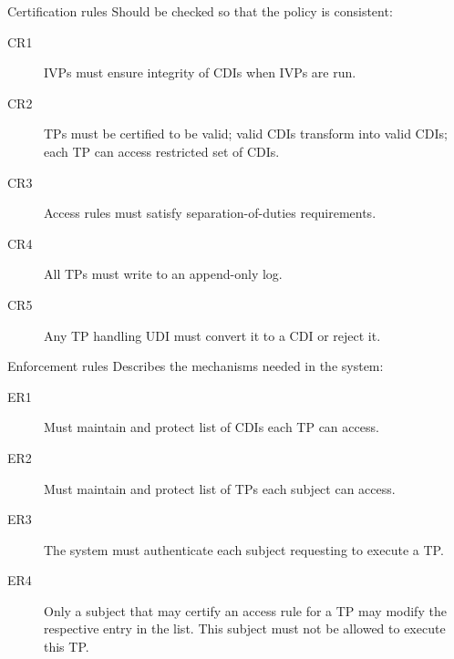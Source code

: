 \begin{frame}
  \begin{block}{Certification rules}
    Should be checked so that the policy is consistent:
    \begin{description}
      \item[CR1] IVPs must ensure integrity of CDIs when IVPs are run.
      \item[CR2] TPs must be certified to be valid; valid CDIs transform into 
        valid CDIs; each TP can access restricted set of CDIs.
      \item[CR3] Access rules must satisfy separation-of-duties requirements.
      \item[CR4] All TPs must write to an append-only log.
      \item[CR5] Any TP handling UDI must convert it to a CDI or reject it.
    \end{description}
  \end{block}
\end{frame}

\begin{frame}
  \begin{block}{Enforcement rules}
    Describes the mechanisms needed in the system:
    \begin{description}
      \item[ER1] Must maintain and protect list of CDIs each TP can access.
      \item[ER2] Must maintain and protect list of TPs each subject can access.
      \item[ER3] The system must authenticate each subject requesting to execute 
        a TP\@.
      \item[ER4] Only a subject that may certify an access rule for a TP may 
        modify the respective entry in the list.
        This subject must not be allowed to execute this TP\@.
    \end{description}
  \end{block}
\end{frame}



\begin{frame}
  \small
  \printbibliography{}
\end{frame}

